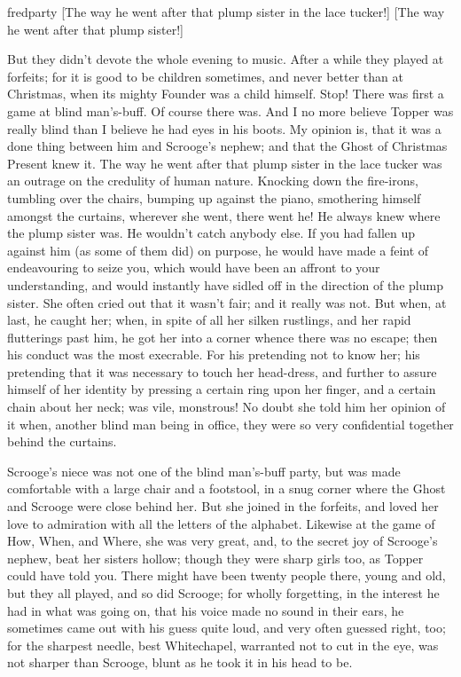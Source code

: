 \begin{colorbigpic}
	[\basicscale]
	{fredparty}
	[The way he went after that plump sister in the lace tucker!]
	[The way he went after that plump sister!]
\end{colorbigpic}

But they didn't devote the whole evening to music. After a while they played at forfeits; for it is good to be children sometimes, and never better than at Christmas, when its mighty Foun\-der was a child himself. Stop! There was first a game at blind man's-buff. Of course there was. And I no more believe Topper was really blind than I believe he had eyes in his boots. My opinion is, that it was a done thing between him and Scrooge's nephew; and that the Ghost of Christmas Present knew it. The way he went after that plump sister in the lace tucker was an outrage on the credulity of human nature. Knocking down the fire-irons, tumbling over the chairs, bumping up against the piano, smothering himself amongst the curtains, wherever she went, there went he! He always knew where the plump sister was. He wouldn't catch anybody else. If you had fallen up against him (as some of them did) on purpose, he would have made a feint of endeavouring to seize you, which would have been an affront to your understanding, and would instantly have sidled off in the direction of the plump sister. She often cried out that it wasn't fair; and it really was not. But when, at last, he caught her; when, in spite of all her silken rustlings, and her rapid flutterings past him, he got her into a corner whence there was no escape; then his conduct was the most execrable. For his pretending not to know her; his pretending that it was necessary to touch her head-dress, and further to assure himself of her identity by pressing a certain ring upon her finger, and a certain chain about her neck; was vile, monstrous! No doubt she told him her opinion of it when, another blind man being in office, they were so very confidential together behind the curtains.

Scrooge's niece was not one of the blind man's-buff party, but was made comfortable with a large chair and a footstool, in a snug corner where the Ghost and Scrooge were close behind her. But she joined in the forfeits, and loved her love to admiration with all the letters of the alphabet. Likewise at the game of How, When, and Where, she was very great, and, to the secret joy of Scrooge's nephew, beat her sisters hollow; though they were sharp girls too, as Topper could have told you. There might have been twenty people there, young and old, but they all played, and so did Scrooge; for wholly forgetting, in the interest he had in what was going on, that his voice made no sound in their ears, he sometimes came out with his guess quite loud, and very often guessed right, too; for the sharpest needle, best Whitechapel, warranted not to cut in the eye, was not sharper than Scrooge, blunt as he took it in his head to be.

